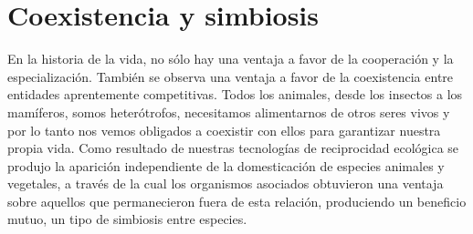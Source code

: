 \documentclass[a4paper,10pt]{book}
\theoremstyle{definition}
\newif\ifen
\newif\ifes
\newcommand{\en}[1]{\ifen#1\fi}
\newcommand{\es}[1]{\ifes#1\fi}
\newcommand{\Ee}{\en{s}\es{e}}
\begin{document}
\es{Cuando el grupo tiene tamaño 1, la estrategia óptima es $\Ee^*=p$. }%
\es{Pero apenas surge la cooperación aparece una ventaja a favor de las estrategias especialistas $\Ee^* > p = 0.71$. }%
%
\es{Cuanto más grande son los grupos, más especialista es vuelve la estrategia óptima. }%
%
\en{At the extremes (cooperative groups of infinite size) the optimal strategy is reached at the maximum level of specialization, $\Ee=1$. }%
\es{En el extremos (grupos cooperativos de tamaño inifinito) la estrategia óptima se alcanza con el nivel de especialización máximo, $\Ee=1$. }%
%
\es{Aquí mostramos que, una vez que la cooperación emerge, las estrategias individualmente mal adaptadas al ambiente (especialistas) consigen superar tanto a las estrategias bien adaptas individualmemte (generalistas), como a sus grupos cooperativos de tamaño infinito. }%

\section{Coexistencia y simbiosis}

En la historia de la vida, no sólo hay una ventaja a favor de la cooperación y la especialización.
%
También se observa una ventaja a favor de la coexistencia entre entidades aprentemente competitivas.
%
Todos los animales, desde los insectos a los mamíferos, somos heterótrofos, necesitamos alimentarnos de otros seres vivos y por lo tanto nos vemos obligados a coexistir con ellos para garantizar nuestra propia vida.
Como resultado de nuestras tecnologías de reciprocidad ecológica se produjo la aparición independiente de la domesticación de especies animales y vegetales, a través de la cual los organismos asociados obtuvieron una ventaja sobre aquellos que permanecieron fuera de esta relación, produciendo un beneficio mutuo, un tipo de simbiosis entre especies.
% 
\end{document}
